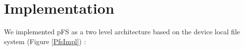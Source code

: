 
\section{Implementation}
\label{sec:impl}

%


We implemented pFS as a two level architecture based on the device
local file system (Figure \ref{PfsImpl}) :

